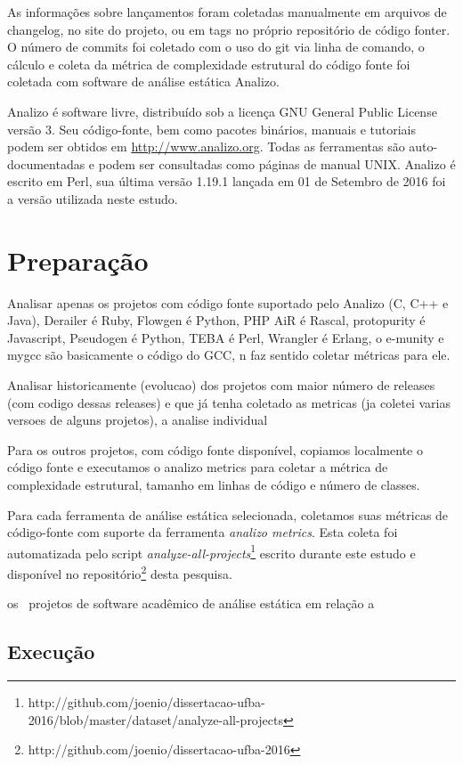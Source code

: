 As informações sobre lançamentos foram coletadas manualmente em arquivos de
changelog, no site do projeto, ou em tags no próprio repositório de código
fonter. O número de commits foi coletado com o uso do git via linha de comando,
o cálculo e coleta da métrica de complexidade estrutural do código fonte foi
coletada com software de análise estática Analizo.

Analizo é software livre, distribuído sob a licença GNU General Public License
versão 3. Seu código-fonte, bem como pacotes binários, manuais e tutoriais
podem ser obtidos em \url{http://www.analizo.org}. Todas as ferramentas são
auto-documentadas e podem ser consultadas como páginas de manual UNIX. 
Analizo é escrito em Perl, sua última versão 1.19.1 lançada em 01 de Setembro de 2016
foi a versão utilizada neste estudo.

\section{Preparação} \label{estudo3:preparacao}

Analisar apenas os projetos com código fonte suportado pelo Analizo (C, C++ e Java),
Derailer é Ruby, Flowgen é Python, PHP AiR é Rascal, protopurity é Javascript,
Pseudogen é Python, TEBA é Perl, Wrangler é Erlang,
o e-munity e mygcc são basicamente o código do GCC, n faz sentido coletar métricas para ele.

Analisar historicamente (evolucao) dos projetos com maior número de releases (com codigo dessas releases)
e que já tenha coletado as metricas (ja coletei varias versoes de alguns projetos), a analise
individual

Para os outros projetos, com código fonte disponível, copiamos localmente o código fonte
e executamos o analizo metrics para coletar a métrica de complexidade estrutural, tamanho em
linhas de código e número de classes.

Para cada ferramenta de análise estática selecionada, coletamos  suas métricas de código-fonte
com suporte da ferramenta {\it analizo metrics}. 
Esta coleta foi automatizada pelo script {\it
analyze-all-projects}\footnote{http://github.com/joenio/dissertacao-ufba-2016/blob/master/dataset/analyze-all-projects}
escrito durante este estudo e  disponível no
repositório\footnote{http://github.com/joenio/dissertacao-ufba-2016} desta
pesquisa.

os \SoftwareCount \ projetos de software acadêmico de análise estática
em relação a 

\subsection{Execução}


